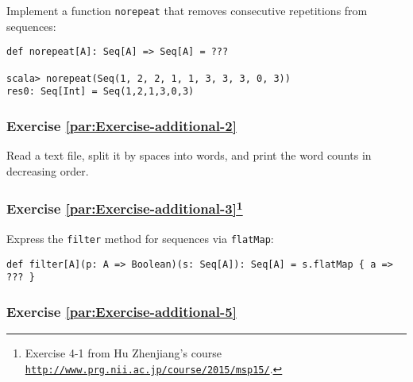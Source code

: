 Implement a function \lstinline!norepeat! that removes consecutive
repetitions from sequences:
\begin{lstlisting}
def norepeat[A]: Seq[A] => Seq[A] = ???

scala> norepeat(Seq(1, 2, 2, 1, 1, 3, 3, 3, 0, 3))
res0: Seq[Int] = Seq(1,2,1,3,0,3)
\end{lstlisting}


\subsubsection{Exercise \label{par:Exercise-additional-2}\ref{par:Exercise-additional-2}}

Read a text file, split it by spaces into words, and print the word
counts in decreasing order.%
\begin{comment}
\begin{enumerate}
\item FPIS exercise 2.2: Check whether a sequence \lstinline!Seq[A]! is
sorted according to a given ordering function of type \lstinline!(A, A) => Boolean!.
\item FPIS exercise 3.24: Implement a function \lstinline!hasSubsequence!
that checks whether a \lstinline!List! contains another \lstinline!List!
as a subsequence. For instance, \lstinline!List(1,2,3,4)! would have
\lstinline!List(1,2)!, \lstinline!List(2,3)!, and \lstinline!List(4)!
as subsequences, among others. (Dynamic programming?)
\end{enumerate}
\end{comment}


\subsubsection{Exercise \label{par:Exercise-additional-3}\ref{par:Exercise-additional-3}\protect\footnote{Exercise 4-1 from Hu Zhenjiang\textsf{'}s course \texttt{\protect\href{http://www.prg.nii.ac.jp/course/2015/msp15/}{http://www.prg.nii.ac.jp/course/2015/msp15/}}.}}

Express the \lstinline!filter! method for sequences via \lstinline!flatMap!:
\begin{lstlisting}
def filter[A](p: A => Boolean)(s: Seq[A]): Seq[A] = s.flatMap { a => ??? }
\end{lstlisting}


\subsubsection{Exercise \label{par:Exercise-additional-5}\ref{par:Exercise-additional-5}}


